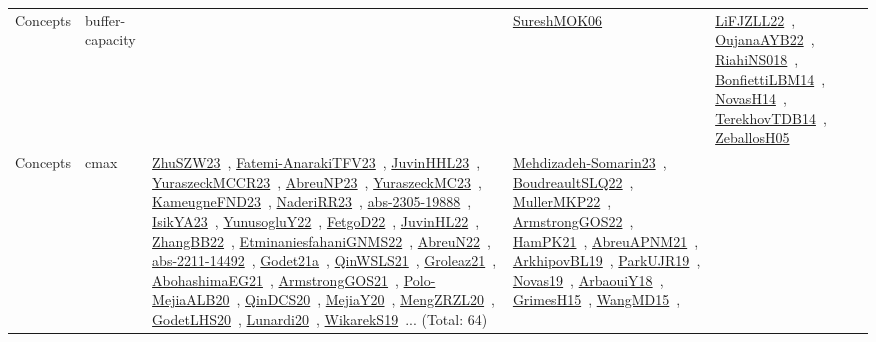 {\begin{longtable}{lp{3cm}>{\raggedright\arraybackslash}p{6cm}>{\raggedright\arraybackslash}p{6cm}>{\raggedright\arraybackslash}p{8cm}}
Concepts & buffer-capacity &  & \href{works/SureshMOK06.pdf}{SureshMOK06}~\cite{SureshMOK06} & \href{works/LiFJZLL22.pdf}{LiFJZLL22}~\cite{LiFJZLL22}, \href{works/OujanaAYB22.pdf}{OujanaAYB22}~\cite{OujanaAYB22}, \href{works/RiahiNS018.pdf}{RiahiNS018}~\cite{RiahiNS018}, \href{works/BonfiettiLBM14.pdf}{BonfiettiLBM14}~\cite{BonfiettiLBM14}, \href{works/NovasH14.pdf}{NovasH14}~\cite{NovasH14}, \href{works/TerekhovTDB14.pdf}{TerekhovTDB14}~\cite{TerekhovTDB14}, \href{works/ZeballosH05.pdf}{ZeballosH05}~\cite{ZeballosH05}\\
Concepts & cmax & \href{works/ZhuSZW23.pdf}{ZhuSZW23}~\cite{ZhuSZW23}, \href{works/Fatemi-AnarakiTFV23.pdf}{Fatemi-AnarakiTFV23}~\cite{Fatemi-AnarakiTFV23}, \href{works/JuvinHHL23.pdf}{JuvinHHL23}~\cite{JuvinHHL23}, \href{works/YuraszeckMCCR23.pdf}{YuraszeckMCCR23}~\cite{YuraszeckMCCR23}, \href{works/AbreuNP23.pdf}{AbreuNP23}~\cite{AbreuNP23}, \href{works/YuraszeckMC23.pdf}{YuraszeckMC23}~\cite{YuraszeckMC23}, \href{works/KameugneFND23.pdf}{KameugneFND23}~\cite{KameugneFND23}, \href{works/NaderiRR23.pdf}{NaderiRR23}~\cite{NaderiRR23}, \href{works/abs-2305-19888.pdf}{abs-2305-19888}~\cite{abs-2305-19888}, \href{works/IsikYA23.pdf}{IsikYA23}~\cite{IsikYA23}, \href{works/YunusogluY22.pdf}{YunusogluY22}~\cite{YunusogluY22}, \href{works/FetgoD22.pdf}{FetgoD22}~\cite{FetgoD22}, \href{works/JuvinHL22.pdf}{JuvinHL22}~\cite{JuvinHL22}, \href{works/ZhangBB22.pdf}{ZhangBB22}~\cite{ZhangBB22}, \href{works/EtminaniesfahaniGNMS22.pdf}{EtminaniesfahaniGNMS22}~\cite{EtminaniesfahaniGNMS22}, \href{works/AbreuN22.pdf}{AbreuN22}~\cite{AbreuN22}, \href{works/abs-2211-14492.pdf}{abs-2211-14492}~\cite{abs-2211-14492}, \href{works/Godet21a.pdf}{Godet21a}~\cite{Godet21a}, \href{works/QinWSLS21.pdf}{QinWSLS21}~\cite{QinWSLS21}, \href{works/Groleaz21.pdf}{Groleaz21}~\cite{Groleaz21}, \href{works/AbohashimaEG21.pdf}{AbohashimaEG21}~\cite{AbohashimaEG21}, \href{works/ArmstrongGOS21.pdf}{ArmstrongGOS21}~\cite{ArmstrongGOS21}, \href{works/Polo-MejiaALB20.pdf}{Polo-MejiaALB20}~\cite{Polo-MejiaALB20}, \href{works/QinDCS20.pdf}{QinDCS20}~\cite{QinDCS20}, \href{works/MejiaY20.pdf}{MejiaY20}~\cite{MejiaY20}, \href{works/MengZRZL20.pdf}{MengZRZL20}~\cite{MengZRZL20}, \href{works/GodetLHS20.pdf}{GodetLHS20}~\cite{GodetLHS20}, \href{works/Lunardi20.pdf}{Lunardi20}~\cite{Lunardi20}, \href{works/WikarekS19.pdf}{WikarekS19}~\cite{WikarekS19}... (Total: 64) & \href{works/Mehdizadeh-Somarin23.pdf}{Mehdizadeh-Somarin23}~\cite{Mehdizadeh-Somarin23}, \href{works/BoudreaultSLQ22.pdf}{BoudreaultSLQ22}~\cite{BoudreaultSLQ22}, \href{works/MullerMKP22.pdf}{MullerMKP22}~\cite{MullerMKP22}, \href{works/ArmstrongGOS22.pdf}{ArmstrongGOS22}~\cite{ArmstrongGOS22}, \href{works/HamPK21.pdf}{HamPK21}~\cite{HamPK21}, \href{works/AbreuAPNM21.pdf}{AbreuAPNM21}~\cite{AbreuAPNM21}, \href{works/ArkhipovBL19.pdf}{ArkhipovBL19}~\cite{ArkhipovBL19}, \href{works/ParkUJR19.pdf}{ParkUJR19}~\cite{ParkUJR19}, \href{works/Novas19.pdf}{Novas19}~\cite{Novas19}, \href{works/ArbaouiY18.pdf}{ArbaouiY18}~\cite{ArbaouiY18}, \href{works/GrimesH15.pdf}{GrimesH15}~\cite{GrimesH15}, \href{works/WangMD15.pdf}{WangMD15}~\cite{WangMD15}, 
\end{longtable}}
